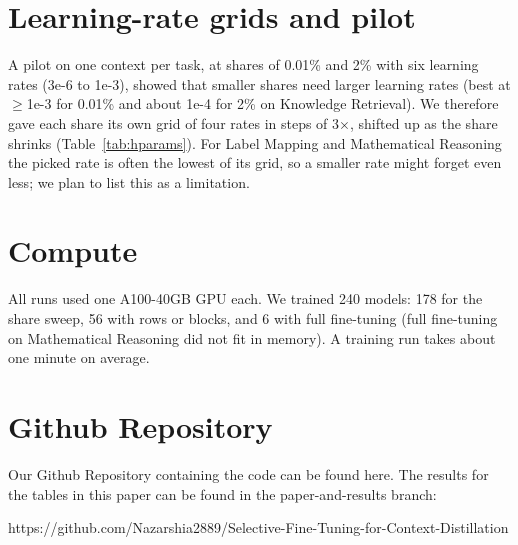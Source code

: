 \documentclass{article} %
\begin{document}
\section{Learning-rate grids and pilot}
\label{app:hparams}
A pilot on one context per task, at shares of 0.01\% and 2\% with six learning rates (3e-6 to 1e-3), showed that smaller shares need larger learning rates (best at $\geq$1e-3 for 0.01\% and about 1e-4 for 2\% on Knowledge Retrieval). We therefore gave each share its own grid of four rates in steps of 3$\times$, shifted up as the share shrinks (Table~\ref{tab:hparams}). For Label Mapping and Mathematical Reasoning the picked rate is often the lowest of its grid, so a smaller rate might forget even less; we plan to list this as a limitation.

\section{Compute}
All runs used one A100-40GB GPU each. We trained 240 models: 178 for the share sweep, 56 with rows or
blocks, and 6 with full fine-tuning (full fine-tuning on Mathematical Reasoning did not fit in memory).
A training run takes about one minute on average.

\section{Github Repository}

Our Github Repository containing the code can be found here. The results for the tables in this paper can be found in the paper-and-results branch: 

https://github.com/Nazarshia2889/Selective-Fine-Tuning-for-Context-Distillation
\end{document}
